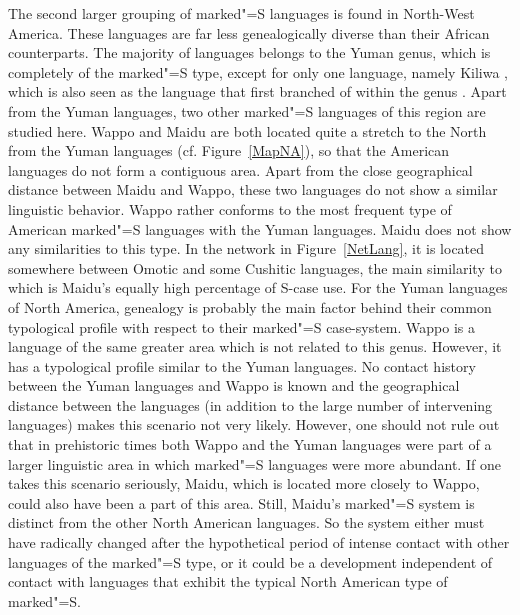The second larger grouping of marked"=S languages is found in North-West America. 
These languages are far less genealogically diverse than their African counterparts. 
The majority of languages belongs to the Yuman genus, which is completely of the marked"=S type, except for only one language, namely Kiliwa \citep{Mixco:1965}, which is also seen as the language that first branched of within the genus \citep{Joel:1998}. %
Apart from the Yuman languages, two other marked"=S languages of this region are studied here. 
Wappo and Maidu are both located quite a stretch to the North from the Yuman languages (cf. Figure~\vref{MapNA}), so that the American languages do not form a contiguous area.
Apart from the close geographical distance between Maidu and Wappo, these two languages do not show a similar linguistic behavior. 
Wappo rather conforms to the most frequent type of American marked"=S languages with the Yuman languages. 
Maidu does not show any similarities to this type.
In the network in Figure~\ref{NetLang}, it is located somewhere between Omotic and some Cushitic languages, the main similarity to which is Maidu's equally high percentage of S-case use.
For the Yuman languages of North America, genealogy is probably the main factor behind their common typological profile with respect to their marked"=S case-system.
Wappo is a language of the same greater area which is not related to this genus. 
However, it has a typological profile similar to the Yuman languages.
No contact history between the Yuman languages and Wappo is known and the geographical distance between the languages (in addition to the large number of intervening languages) makes this scenario not very likely. 
However, one should not rule out that in prehistoric times both Wappo and the Yuman languages were part of a larger linguistic area in which marked"=S languages were more abundant. 
If one takes this scenario seriously, Maidu, which is located more closely to Wappo, could also have been a part of this area. 
Still, Maidu's marked"=S system is distinct from the other North American languages. 
So the system either must have radically changed after the hypothetical period of intense contact with other languages of the marked"=S type, or it could be a development independent of contact with languages that exhibit the typical North American type of marked"=S.


